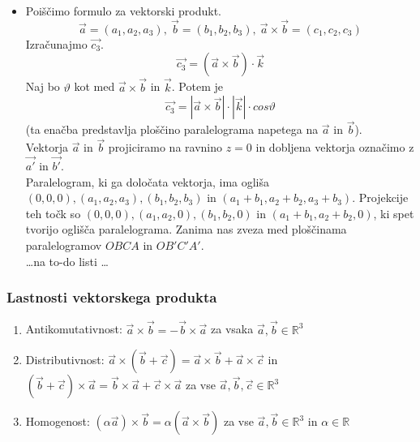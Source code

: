 \documentclass[a4paper,12pt]{article}
\begin{document}
\begin{itemize}
\item Poiščimo formulo za vektorski produkt.
$$ \vec{a} = (a_1, a_2, a_3), ~ \vec{b} = (b_1, b_2, b_3), ~ \vec{a} \times \vec{b} = (c_1, c_2, c_3)$$
Izračunajmo $ \vec{c_3} $.
$$ \vec{c_3} = (\vec{a} \times \vec{b}) \cdot \vec{k} $$
Naj bo $\vartheta$ kot med $\vec{a} \times \vec{b}$ in $\vec{k}$. Potem je 
$$ \vec{c_3} = | \vec{a} \times \vec{b} | \cdot |\vec{k}| \cdot cos\vartheta $$
(ta enačba predstavlja ploščino paralelograma napetega na $\vec{a}$ in $\vec{b}$).\\

Vektorja $\vec{a}$ in $ \vec{b}$ projiciramo na ravnino $z=0$ in dobljena vektorja označimo z $\vec{a'}$ in $\vec{b'}$.\\

Paralelogram, ki ga določata vektorja, ima ogliša $(0,0,0), (a_1, a_2, a_3), (b_1, b_2, b_3)$ in $ (a_1 + b_1, a_2 + b_2, a_3 + b_3)$. Projekcije teh točk so $(0,0,0), (a_1, a_2, 0), (b_1, b_2, 0)$ in $ (a_1 + b_1, a_2 + b_2, 0)$, ki spet tvorijo oglišča paralelograma. Zanima nas zveza med ploščinama paralelogramov $OBCA$ in $OB'C'A'$. \\

\ldots na to-do listi \ldots 
\end{itemize}

\newpage

\begin{center}
\subsubsection{Lastnosti vektorskega produkta}
\end{center}

\begin{enumerate}
\item Antikomutativnost: $ \vec{a} \times \vec{b} = - \vec{b} \times \vec{a}$ za vsaka $\vec{a}, \vec{b} \in \mathbb{R}^3$
\item Distributivnost: $ \vec{a} \times (\vec{b} + \vec{c}) = \vec{a} \times \vec{b} + \vec{a} \times \vec{c}$ in $(\vec{b} + \vec{c}) \times \vec{a} = \vec{b} \times \vec{a} + \vec{c} \times \vec{a}$ za vse $ \vec{a}, \vec{b}, \vec{c} \in \mathbb{R}^3$
\item Homogenost: $(\alpha \vec{a}) \times \vec{b} = \alpha ( \vec{a} \times \vec{b}) $ za vse $\vec{a}, \vec{b} \in \mathbb{R}^3$ in $\alpha \in \mathbb{R}$
\end{enumerate}
\end{document}
